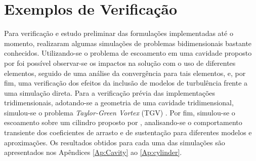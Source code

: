 \section{Exemplos de Verificação} \label{ExemplosMT}

Para verificação e estudo preliminar das formulações implementadas até o momento, realizaram algumas simulações de problemas bidimensionais bastante conhecidos. Utilizando-se o problema de escoamento em uma cavidade proposto por \cite{} foi possível observar-se os impactos na solução com o uso de diferentes elementos, seguido de uma análise da convergência para tais elementos, e, por fim, uma verificação dos efeitos da inclusão de modelos de turbulência frente a uma simulação direta. Para a verificação prévia das implementações tridimensionais, adotando-se a geometria de uma cavidade tridimensional, simulou-se o problema \textit{Taylor-Green Vortex} (TGV) \cite{}. Por fim, simulou-se o escoamento sobre um cilindro proposto por \cite{}, analisando-se o comportamento transiente dos coeficientes de arrasto e de sustentação para diferentes modelos e aproximações. Os resultados obtidos para cada uma das simulações são apresentados nos Apêndices \ref{Ap:Cavity} ao \ref{Ap:cylinder}.

